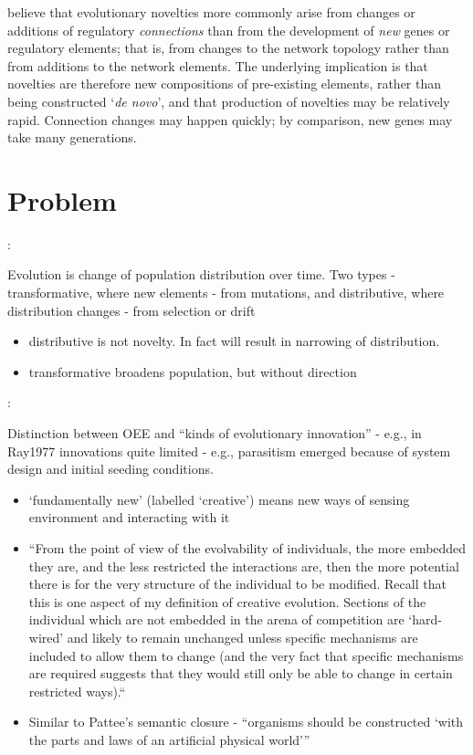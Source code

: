 \autocite{Prudhomme:2007ax} believe that evolutionary novelties more
commonly arise from changes or additions of regulatory
\emph{connections} than from the development of \emph{new} genes or
regulatory elements; that is, from changes to the network topology
rather than from additions to the network elements. The underlying
implication is that novelties are therefore new compositions of
pre-existing elements, rather than being constructed `\emph{de novo}',
and that production of novelties may be relatively rapid. Connection
changes may happen quickly; by comparison, new genes may take many generations.

\section{Problem}
\autocite{Bourrat2015}:

Evolution is change of population distribution over time. Two types - transformative, where new elements - from mutations, and
distributive, where distribution changes - from selection or drift
\begin{itemize}
	\item distributive is not novelty. In fact will result in narrowing of distribution.
	\item transformative broadens population, but without direction
\end{itemize}

\autocite{Taylor2001}:

	Distinction between OEE and ``kinds of evolutionary innovation'' -
	e.g., in Ray1977 innovations quite limited - e.g., parasitism emerged
	because of system design and initial seeding conditions.
	
	\begin{itemize}
		\item
		
		`fundamentally new' (labelled `creative') means new ways of sensing
		environment and interacting with it
		
		\item
		
		``From the point of view of the evolvability of individuals, the
		more embedded they are, and the less restricted the interactions
		are, then the more potential there is for the very structure of the
		individual to be modified. Recall that this is one aspect of my
		definition of creative evolution. Sections of the individual which
		are not embedded in the arena of competition are `hard-wired' and
		likely to remain unchanged unless specific mechanisms are included
		to allow them to change (and the very fact that specific mechanisms
		are required suggests that they would still only be able to change
		in certain restricted ways).``
		
		\item
		
		Similar to Pattee's semantic closure - ``organisms should be
		constructed `with the parts and laws of an artificial physical
		world'''
		
	\end{itemize}


